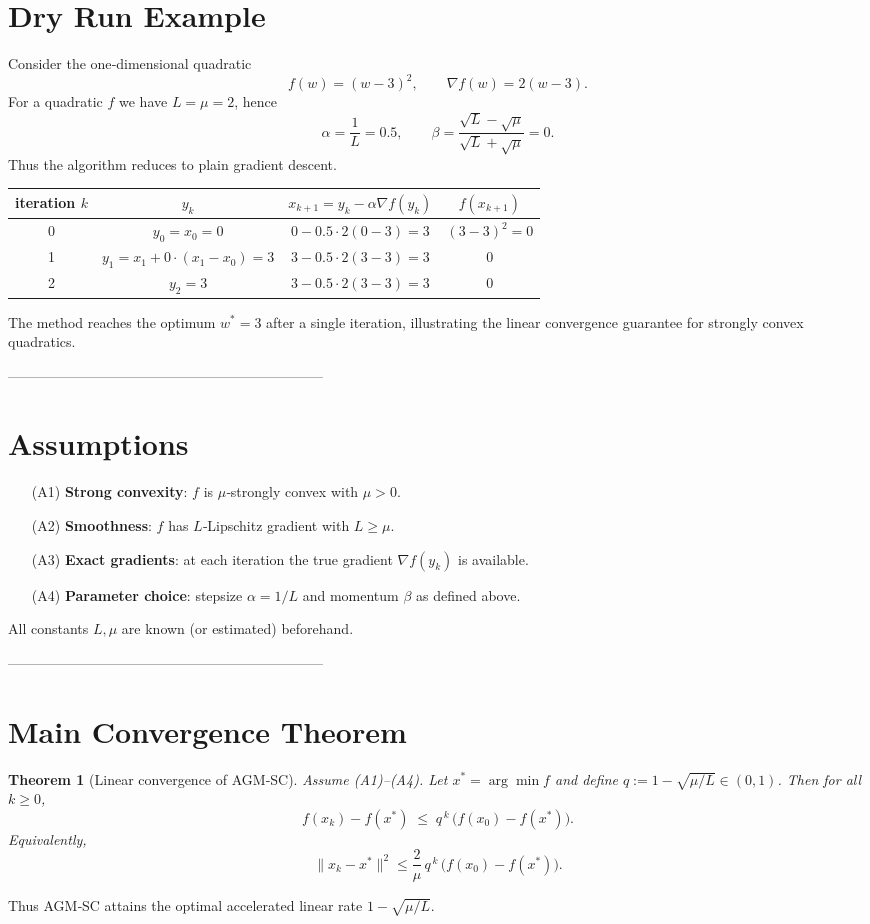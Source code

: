 \documentclass{article}
\newtheorem{theorem}{Theorem}
\begin{document}
\section*{Dry Run Example}
Consider the one‑dimensional quadratic
\[
f(w)=(w-3)^{2},\qquad \nabla f(w)=2(w-3).
\]
For a quadratic $f$ we have $L=\mu=2$, hence
\[
\alpha=\frac{1}{L}=0.5,\qquad 
\beta=\frac{\sqrt{L}-\sqrt{\mu}}{\sqrt{L}+\sqrt{\mu}}=0.
\]
Thus the algorithm reduces to plain gradient descent.

\begin{center}
\begin{tabular}{c|c|c|c}
iteration $k$ & $y_k$ & $x_{k+1}=y_k-\alpha\nabla f(y_k)$ & $f(x_{k+1})$\\ \hline
0 & $y_0=x_0=0$ &
$0-0.5\cdot 2(0-3)=3$ & $(3-3)^2=0$\\ \hline
1 & $y_1=x_1+0\cdot(x_1-x_0)=3$ &
$3-0.5\cdot 2(3-3)=3$ & $0$\\ \hline
2 & $y_2=3$ &
$3-0.5\cdot 2(3-3)=3$ & $0$
\end{tabular}
\end{center}
The method reaches the optimum $w^{\ast}=3$ after a single iteration, illustrating the linear convergence guarantee for strongly convex quadratics.

--------------------------------------------------------------------
\section*{Assumptions}
\begin{enumerate}
\item[(A1)] \textbf{Strong convexity}: $f$ is $\mu$‑strongly convex with $\mu>0$.
\item[(A2)] \textbf{Smoothness}: $f$ has $L$‑Lipschitz gradient with $L\ge\mu$.
\item[(A3)] \textbf{Exact gradients}: at each iteration the true gradient $\nabla f(y_k)$ is available.
\item[(A4)] \textbf{Parameter choice}: stepsize $\alpha=1/L$ and momentum $\beta$ as defined above.
\end{enumerate}
All constants $L,\mu$ are known (or estimated) beforehand.

--------------------------------------------------------------------
\section*{Main Convergence Theorem}
\begin{theorem}[Linear convergence of AGM‑SC]\label{thm:linear}
Assume (A1)–(A4). Let $x^{\ast}=\arg\min f$ and define $q:=1-\sqrt{\mu/L}\in(0,1)$. Then for all $k\ge 0$,
\[
\boxed{f(x_k)-f(x^{\ast})\;\le\; q^{\,k}\,\bigl(f(x_0)-f(x^{\ast})\bigr)}.
\tag{3}
\]
Equivalently,
\[
\|x_k-x^{\ast}\|^{2}\le \frac{2}{\mu}\,q^{\,k}\,\bigl(f(x_0)-f(x^{\ast})\bigr).
\tag{4}
\]
\end{theorem}
Thus AGM‑SC attains the optimal accelerated linear rate $1-\sqrt{\mu/L}$.
\end{document}
